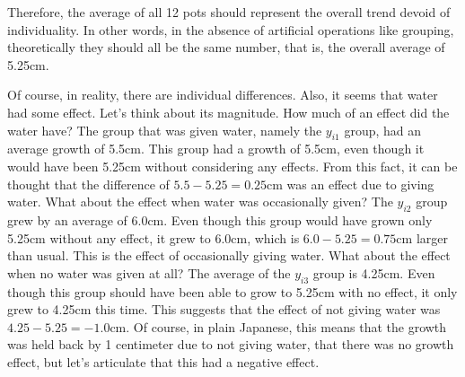 \documentclass{ltjbook}
\begin{document}
Therefore, the average of all 12 pots should represent the overall trend devoid of individuality. In other words, in the absence of artificial operations like grouping, theoretically they should all be the same number, that is, the overall average of 5.25cm.

Of course, in reality, there are individual differences. Also, it seems that water had some effect. Let's think about its magnitude. How much of an effect did the water have? The group that was given water, namely the $y_{i1}$ group, had an average growth of 5.5cm. This group had a growth of 5.5cm, even though it would have been 5.25cm without considering any effects. From this fact, it can be thought that the difference of $5.5-5.25=0.25$cm was an effect due to giving water. What about the effect when water was occasionally given? The $y_{i2}$ group grew by an average of 6.0cm. Even though this group would have grown only 5.25cm without any effect, it grew to 6.0cm, which is $6.0-5.25=0.75$cm larger than usual. This is the effect of occasionally giving water. What about the effect when no water was given at all? The average of the $y_{i3}$ group is 4.25cm. Even though this group should have been able to grow to 5.25cm with no effect, it only grew to 4.25cm this time. This suggests that the effect of not giving water was $4.25-5.25=-1.0$cm. Of course, in plain Japanese, this means that the growth was held back by 1 centimeter due to not giving water, that there was no growth effect, but let's articulate that this had a negative effect.
\end{document}
